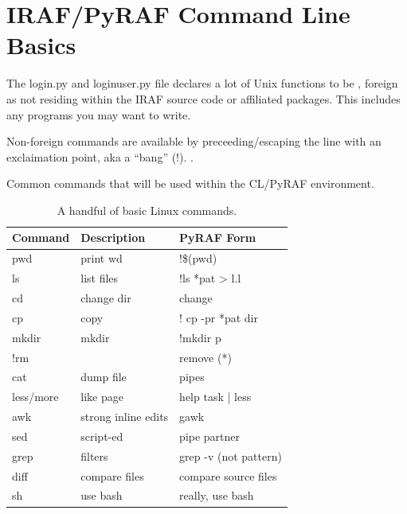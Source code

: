 \renewcommand{\footerfilename}{Commandline.tex}


\section{IRAF/PyRAF Command Line Basics}

The login.py and loginuser.py file declares a lot of Unix functions
to be  , foreign as not residing
within the IRAF source code or affiliated packages. This includes any
programs you may want to write. 

Non-foreign commands are available by preceeding/escaping the
line with an exclaimation point, aka a ``bang'' (!). .

Common commands that will be used within the CL/PyRAF environment.

\begin{table}[h!]
\centering
\begin{tabular}{| l | l | l |}
\hline
Command  & Description   & PyRAF Form   \\
\hline
pwd       & print wd            & !\$(pwd)    \\ 
ls        & list files          & !ls *pat > l.l    \\ 
cd        & change dir          & change     \\ 
cp        & copy                & ! cp -pr *pat dir    \\ 
mkdir     & mkdir               & !mkdir p     \\ 
!rm       &                     & remove (*)    \\ 
cat       & dump file           & pipes    \\ 
less/more & like page           & help task  | less    \\ 
awk       & strong inline edits & gawk    \\ 
sed       & script-ed           & pipe partner    \\ 
grep      & filters             & grep -v (not pattern)    \\ 
diff      & compare files       & compare source files    \\ 
sh        & use bash            & really, use bash    \\ 
\hline
\end{tabular}
\caption[Basic Linux Commands]{A handful of basic Linux commands.}
\label{table:BasicCommands}
\end{table}


